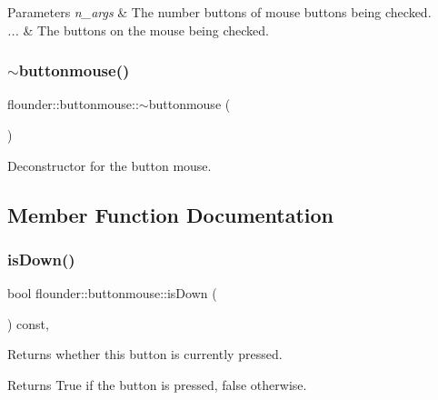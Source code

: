 \begin{DoxyParams}{Parameters}
{\em n\+\_\+args} & The number buttons of mouse buttons being checked. \\
\hline
{\em ...} & The buttons on the mouse being checked. \\
\hline
\end{DoxyParams}
\mbox{\label{classflounder_1_1buttonmouse_aa967f7f977040b0f4a58dc10d4414e75}} 
\subsubsection{\texorpdfstring{$\sim$buttonmouse()}{~buttonmouse()}}
{\footnotesize\ttfamily flounder\+::buttonmouse\+::$\sim$buttonmouse (\begin{DoxyParamCaption}{ }\end{DoxyParamCaption})}



Deconstructor for the button mouse. 



\subsection{Member Function Documentation}
\mbox{\label{classflounder_1_1buttonmouse_ad4f5435d1141e54169c96a4ff8ea8ab7}} 
\subsubsection{\texorpdfstring{is\+Down()}{isDown()}}
{\footnotesize\ttfamily bool flounder\+::buttonmouse\+::is\+Down (\begin{DoxyParamCaption}{ }\end{DoxyParamCaption}) const\hspace{0.3cm}{\ttfamily [override]}, {\ttfamily [virtual]}}



Returns whether this button is currently pressed. 

\begin{DoxyReturn}{Returns}
True if the button is pressed, false otherwise. 
\end{DoxyReturn}


